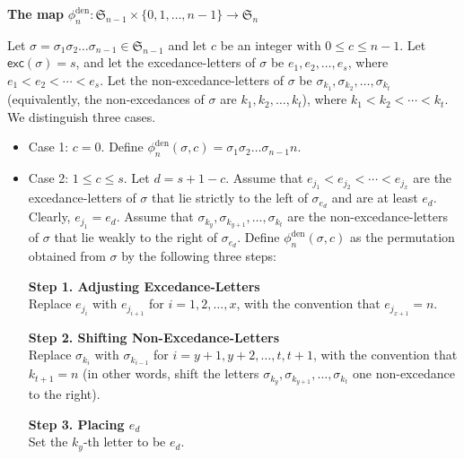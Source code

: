\documentclass[12pt]{article}
\begin{document}
\begin{framed}
\begin{center}
\vskip -6pt
{\bf{The map}} $\phi_{n}^{\text{den}}: \mathfrak{S}_{n-1}\times\{0,1,\ldots,n-1\}\rightarrow\mathfrak{S}_{n}$
\end{center}
\vskip -6pt

Let $\sigma=\sigma_{1}\sigma_{2}\ldots\sigma_{n-1}\in\mathfrak{S}_{n-1}$ and let $c$ be an integer with $0\leq c\leq n-1$.
Let $\textsf{exc}(\sigma)=s$, and let the excedance-letters of $\sigma$ be
$e_{1},e_{2},\ldots,e_{s}$, where $e_{1}<e_{2}<\cdots<e_{s}$.
Let the non-excedance-letters of $\sigma$ be 
$\sigma_{k_{1}},\sigma_{k_{2}},\ldots,\sigma_{k_{t}}$ (equivalently, the non-excedances of $\sigma$ are $k_{1},k_{2},\ldots,k_{t}$), where $k_{1}<k_{2}<\cdots<k_{t}$. 
We distinguish three cases.
\begin{itemize}[leftmargin=1.5em]
\vskip 2pt	
\item[$\bullet$]
 Case 1: $c=0$. 
 Define $\phi_{n}^{\text{den}}(\sigma,c)=\sigma_{1}\sigma_{2}\ldots\sigma_{n-1}n$.

\vskip 2pt	
\item[$\bullet$] 
Case 2: $1\leq c\leq s$. 
Let $d=s+1-c$.
Assume that $e_{j_{1}}<e_{j_{2}}<\cdots<e_{j_{x}}$ are the excedance-letters of $\sigma$ that lie strictly to the left of $\sigma_{e_{d}}$ and are at least $e_{d}$.
Clearly, $e_{j_{1}}=e_{d}$.
Assume that $\sigma_{k_{y}},\sigma_{k_{y+1}},\ldots,\sigma_{k_{t}}$ are the non-excedance-letters of $\sigma$ that lie weakly to the right of $\sigma_{e_{d}}$.
Define $\phi_{n}^{\text{den}}(\sigma,c)$  as the permutation obtained from $\sigma$ by the following three steps:

\vskip 2pt	

\textbf{Step 1.  Adjusting Excedance-Letters}\\
	Replace $e_{j_{i}}$ with $e_{j_{i+1}}$ for  $i=1,2,\ldots,x$, with the convention that $e_{j_{x+1}}=n$.
	
\vskip 2pt	
	
\textbf{Step 2.  Shifting Non-Excedance-Letters}\\
	Replace  $\sigma_{k_{i}}$ with $\sigma_{k_{i-1}}$ for $i=y+1,y+2,\ldots,t,t+1$, with the convention that $k_{t+1}=n$
	(in other words, shift the letters $\sigma_{k_{y}},\sigma_{k_{y+1}},\ldots,\sigma_{k_{t}}$ one non-excedance  to the right).
	
\vskip 2pt		
	
\textbf{Step 3.  Placing $e_{d}$}\\
	Set the $k_{y}$-th letter to be $e_{d}$.


\end{itemize}
\end{framed}
\end{document}
